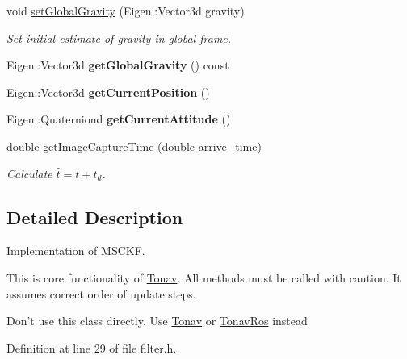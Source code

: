 \begin{DoxyCompactItemize}
\item 
void \hyperlink{class_filter_ad046b83209a1f03d65ac75f16b538546}{set\-Global\-Gravity} (Eigen\-::\-Vector3d gravity)
\begin{DoxyCompactList}\small\item\em Set initial estimate of gravity in global frame. \end{DoxyCompactList}\item 
\hypertarget{class_filter_aeeb0c2e971a47c73c2f950aa8890f1ac}{Eigen\-::\-Vector3d {\bfseries get\-Global\-Gravity} () const }\label{class_filter_aeeb0c2e971a47c73c2f950aa8890f1ac}

\item 
\hypertarget{class_filter_a936ea0f9f4f587d0cd9bc26a4a73df34}{Eigen\-::\-Vector3d {\bfseries get\-Current\-Position} ()}\label{class_filter_a936ea0f9f4f587d0cd9bc26a4a73df34}

\item 
\hypertarget{class_filter_a7094e57e502a4fc7f124f0d1184eb133}{Eigen\-::\-Quaterniond {\bfseries get\-Current\-Attitude} ()}\label{class_filter_a7094e57e502a4fc7f124f0d1184eb133}

\item 
double \hyperlink{class_filter_a1c7a33a737fafec46d6e98ec1be37a4c}{get\-Image\-Capture\-Time} (double arrive\-\_\-time)
\begin{DoxyCompactList}\small\item\em Calculate $\hat{t} = t + \hat{t}_d$. \end{DoxyCompactList}\end{DoxyCompactItemize}


\subsection{Detailed Description}
Implementation of M\-S\-C\-K\-F. 

This is core functionality of \hyperlink{class_tonav}{Tonav}. All methods must be called with caution. It assumes correct order of update steps.

Don't use this class directly. Use \hyperlink{class_tonav}{Tonav} or \hyperlink{class_tonav_ros}{Tonav\-Ros} instead 

Definition at line 29 of file filter.\-h.



